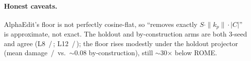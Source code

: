 \paragraph{Honest caveats.} AlphaEdit's floor is not perfectly cosine-flat, so
``removes exactly $S\cdot\|k_p\|\cdot|C|$'' is approximate, not exact. The
holdout and by-construction arms are both 3-seed and agree
(L8 \hoRhoLeight{}\,/\,\cbcRhoLeight{}; L12 \hoRhoLtwelve{}\,/\,\cbcRhoLtwelve{});
the floor rises modestly under the holdout projector (mean damage
\hoDmgLeightAlpha{}\,/\,\hoDmgLtwelveAlpha{} vs.\ $\sim$0.08 by-construction),
still $\sim$30$\times$ below ROME.


